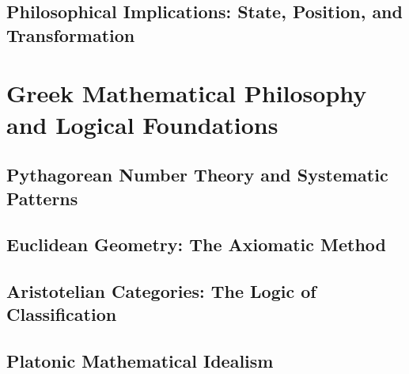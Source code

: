 \documentclass[12pt, oneside, openany]{book}
\begin{document}
\section{Philosophical Implications: State, Position, and Transformation}


\chapter{Greek Mathematical Philosophy and Logical Foundations}

\section{Pythagorean Number Theory and Systematic Patterns}

\section{Euclidean Geometry: The Axiomatic Method}

\section{Aristotelian Categories: The Logic of Classification}

\section{Platonic Mathematical Idealism}

\end{document}
